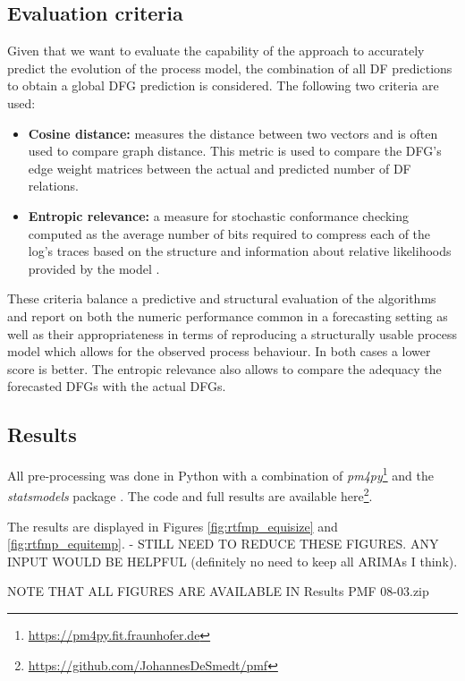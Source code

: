 \subsection{Evaluation criteria}
Given that we want to evaluate the capability of the approach to accurately predict the evolution of the process model, the combination of all DF predictions to obtain a global DFG prediction is considered.
The following two criteria are used:
\begin{itemize}
	\item \textbf{Cosine distance:} measures the distance between two vectors and is often used to compare graph distance. This metric is used to compare the DFG's edge weight matrices between the actual and predicted number of DF relations.
	\item \textbf{Entropic relevance:} a measure for stochastic conformance checking computed as the average number of bits required to compress each of the log’s traces based on the structure and information about relative likelihoods provided by the model \cite{DBLP:conf/icpm/PolyvyanyyMG20}.
\end{itemize}
These criteria balance a predictive and structural evaluation of the algorithms and report on both the numeric performance common in a forecasting setting as well as their appropriateness in terms of reproducing a structurally usable process model which allows for the observed process behaviour.
In both cases a lower score is better.
The entropic relevance also allows to compare the adequacy the forecasted DFGs with the actual DFGs.

\subsection{Results}
All pre-processing was done in Python with a combination of \emph{pm4py}\footnote{\url{https://pm4py.fit.fraunhofer.de}} and the \emph{statsmodels} package \cite{seabold2010statsmodels}. 
The code and full results are available here\footnote{\url{https://github.com/JohannesDeSmedt/pmf}}.

The results are displayed in Figures \ref{fig:rtfmp_equisize} and \ref{fig:rtfmp_equitemp}. - STILL NEED TO REDUCE THESE FIGURES. ANY INPUT WOULD BE HELPFUL (definitely no need to keep all ARIMAs I think). 

NOTE THAT ALL FIGURES ARE AVAILABLE IN Results PMF 08-03.zip

